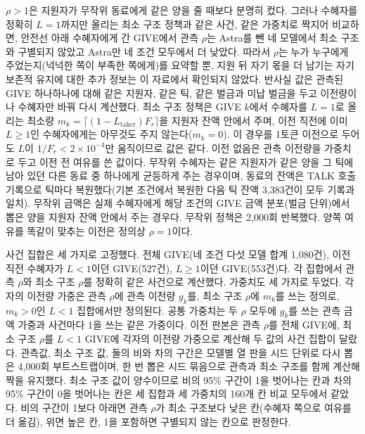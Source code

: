 $\rho>1$은 지원자가 무작위 동료에게 같은 양을 줄 때보다 분명히 컸다. 그러나 수혜자를 정확히 $L=1$까지만 올리는 최소 구조 정책과 같은 사건, 같은 가중치로 짝지어 비교하면, 안전선 아래 수혜자에게 간 GIVE에서 관측 $\rho$는 Astra를 뺀 네 모델에서 최소 구조와 구별되지 않았고 Astra만 네 조건 모두에서 더 낮았다. 따라서 $\rho$는 누가 누구에게 주었는지(넉넉한 쪽이 부족한 쪽에게)를 요약할 뿐, 지원 뒤 자기 몫을 더 남기는 자기 보존적 유지에 대한 추가 정보는 이 자료에서 확인되지 않았다. 반사실 값은 관측된 GIVE 하나하나에 대해 같은 지원자, 같은 틱, 같은 벌금과 미납 벌금을 두고 이전량이나 수혜자만 바꿔 다시 계산했다. 최소 구조 정책은 GIVE $k$에서 수혜자를 $L=1$로 올리는 최소량 $m_k=\lceil(1-L_{\mathrm{taker}})F_r\rceil$을 지원자 잔액 안에서 주며, 이전 직전에 이미 $L\geq1$인 수혜자에게는 아무것도 주지 않는다($m_k=0$). 이 경우를 1토큰 이전으로 두어도 $L$이 $1/F_r<2\times10^{-4}$만 움직이므로 값은 같다. 이전 없음은 관측 이전량을 가중치로 두고 이전 전 여유를 쓴 값이다. 무작위 수혜자는 같은 지원자가 같은 양을 그 틱에 남아 있던 다른 동료 중 하나에게 균등하게 주는 경우이며, 동료의 잔액은 TALK 호출 기록으로 틱마다 복원했다(기본 조건에서 복원한 다음 틱 잔액 3,383건이 모두 기록과 일치). 무작위 금액은 실제 수혜자에게 해당 조건의 GIVE 금액 분포(벌금 단위)에서 뽑은 양을 지원자 잔액 안에서 주는 경우다. 무작위 정책은 2,000회 반복했다. 양쪽 여유를 똑같이 맞추는 이전은 정의상 $\rho=1$이다.

사건 집합은 세 가지로 고정했다. 전체 GIVE(네 조건 다섯 모델 합계 1,080건), 이전 직전 수혜자가 $L<1$이던 GIVE(527건), $L\geq1$이던 GIVE(553건)다. 각 집합에서 관측 $\rho$와 최소 구조 $\rho$를 정확히 같은 사건으로 계산했다. 가중치도 세 가지로 두었다. 각자의 이전량 가중은 관측 $\rho$에 관측 이전량 $g_k$를, 최소 구조 $\rho$에 $m_k$를 쓰는 정의로, $m_k>0$인 $L<1$ 집합에서만 정의된다. 공통 가중치는 두 $\rho$ 모두에 $g_k$를 쓰는 관측 금액 가중과 사건마다 1을 쓰는 같은 가중이다. 이전 판본은 관측 $\rho$를 전체 GIVE에, 최소 구조 $\rho$를 $L<1$ GIVE에 각자의 이전량 가중으로 계산해 두 값의 사건 집합이 달랐다. 관측값, 최소 구조 값, 둘의 비와 차의 구간은 모델별 열 판을 시드 단위로 다시 뽑은 4,000회 부트스트랩이며, 한 번 뽑은 시드 묶음으로 관측과 최소 구조를 함께 계산해 짝을 유지했다. 최소 구조 값이 양수이므로 비의 95\% 구간이 1을 벗어나는 칸과 차의 95\% 구간이 0을 벗어나는 칸은 세 집합과 세 가중치의 160개 칸 비교 모두에서 같았다. 비의 구간이 1보다 아래면 관측 $\rho$가 최소 구조보다 낮은 칸(수혜자 쪽으로 여유를 더 옮김), 위면 높은 칸, 1을 포함하면 구별되지 않는 칸으로 판정한다.


